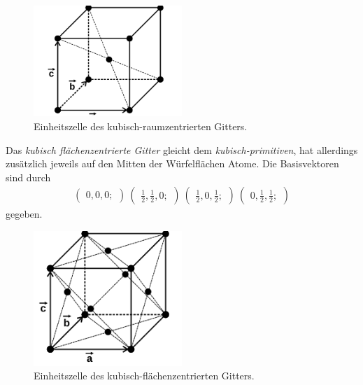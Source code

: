 \begin{figure}[hhh]
\centering
\includegraphics[width=0.5\textwidth]{abbildungen/bcc.png}
\caption{Einheitszelle des kubisch-raumzentrierten Gitters.\cite{sample}}
\label{fig:bcc}
\end{figure}

Das \textit{kubisch flächenzentrierte Gitter} gleicht dem
\textit{kubisch-primitiven}, hat
allerdings zusätzlich jeweils auf den Mitten der Würfelflächen Atome.
Die Basisvektoren sind durch
\begin{align}
\label{eqn:3*}
\begin{pmatrix}
0, 0, 0;
\end{pmatrix}\
\begin{pmatrix}
\frac{1}{2}, \frac{1}{2}, 0;
\end{pmatrix}\
\begin{pmatrix}
\frac{1}{2}, 0, \frac{1}{2};
\end{pmatrix}\
\begin{pmatrix}
0, \frac{1}{2}, \frac{1}{2};
\end{pmatrix}
\end{align}
gegeben.

\begin{figure}[hhh]
\centering
\includegraphics[width=0.5\textwidth]{abbildungen/fcc.png}
\caption{Einheitszelle des kubisch-flächenzentrierten Gitters.\cite{sample}}
\label{fig:fcc}
\end{figure}

